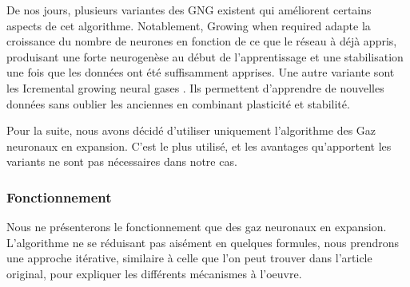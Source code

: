 	De nos jours, plusieurs variantes des GNG existent qui améliorent certains aspects de cet algorithme. Notablement, Growing when required \cite{marsland2002self} adapte la croissance du nombre de neurones en fonction de ce que le réseau à déjà appris, produisant une forte neurogenèse au début de l'apprentissage et une stabilisation une fois que les données ont été suffisamment apprises. Une autre variante sont les Icremental growing neural gases \cite{prudent2005incremental}. Ils permettent d'apprendre de nouvelles données sans oublier les anciennes en combinant plasticité et stabilité.

	Pour la suite, nous avons décidé d'utiliser uniquement l'algorithme des Gaz neuronaux en expansion. C'est le plus utilisé, et les avantages qu'apportent les variants ne sont pas nécessaires dans notre cas.

	\subsubsection{Fonctionnement}

	Nous ne présenterons le fonctionnement que des gaz neuronaux en expansion. L'algorithme ne se réduisant pas aisément en quelques formules, nous prendrons une approche itérative, similaire à celle que l'on peut trouver dans l'article original, pour expliquer les différents mécanismes à l'oeuvre.\\

